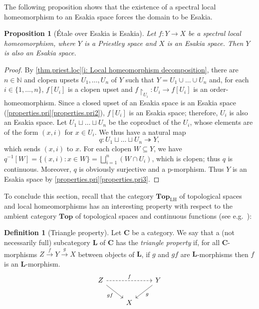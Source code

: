 \documentclass[12pt]{amsart}
\theoremstyle{plain}
\newtheorem{proposition}[theorem]{Proposition}
\theoremstyle{definition}
\newtheorem{definition}[theorem]{Definition}
\newcommand{\cat}[1]{\mathbf{#1}}
\newcommand{\N}{\mathbb{N}}
\newcommand{\Top}{\cat{Top}}
\newcommand{\TopLH}{\Top_{\mathrm{LH}}}
\begin{document}
The following proposition shows that the existence of a spectral local homeomorphism to an Esakia space forces the domain to be Esakia.

\begin{proposition}[\'Etale over Esakia is Esakia]\label{prop: closure of Esakia under spectral}
    Let $f\colon Y\to X$ be a spectral local homeomorphism, where $Y$ is a Priestley space and $X$ is an Esakia space. Then $Y$ is also an Esakia space.
\end{proposition}
\begin{proof}
    By \cref{thm.priest.loc}\eqref{i: Local homeomorphism decomposition}, there are $n \in \N$ and clopen upsets $U_{1},\dots,U_{n}$ of $Y$ such that $Y=U_{1}\cup\dots\cup U_{n}$ and, for each $i \in \{1, \dots, n\}$, $f[U_i]$ is a clopen upset and $f {\restriction}_{U_i} \colon U_i \to f[U_i]$ is an order-homeomorphism.
    Since a closed upset of an Esakia space is an Esakia space (\cref{properties.pri}\eqref{properties.pri2}), $f[U_{i}]$ is an Esakia space; therefore, $U_{i}$ is also an Esakia space. Let $U_{1}\sqcup \dots \sqcup U_{n}$ be the coproduct of the $U_{i}$, whose elements are of the form $(x,i)$ for $x\in U_{i}$. We thus have a natural map
    \begin{equation*}
        q\colon U_{1}\sqcup \dots \sqcup U_{n} \twoheadrightarrow Y,
    \end{equation*}
    which sends $(x,i)$ to $x$. For each clopen $W\subseteq Y$, we have $q^{-1}[W]=\{(x,i) : x\in W\}=\bigsqcup_{i=1}^{n}(W\cap U_{i})$, which is clopen; thus $q$ is continuous. Moreover, $q$ is obviously surjective and a p-morphism. Thus $Y$ is an Esakia space by \cref{properties.pri}\eqref{properties.pri3}.
\end{proof}



To conclude this section, recall that the category $\TopLH$ of topological spaces and local homeomorphisms has an interesting property with respect to the ambient category $\Top$ of topological spaces and continuous functions (see e.g.\ \cite[Lem.~6.4.5]{janelidzeborceaux}):

\begin{definition}[Triangle property]
    Let $\cat{C}$ be a category.
    We say that a (not necessarily full) subcategory $\cat{L}$ of $\cat{C}$ has the \emph{triangle property} if, for all  $\cat{C}$-morphisms $Z \xrightarrow{f} Y \xrightarrow{g} X$ between objects of $\cat{L}$, if $g$ and $g f$ are $\cat{L}$-morphisms then $f$ is an $\cat{L}$-morphism.
    \[
        \begin{tikzcd}
            Z \arrow[rd, "gf"'] \arrow[rr, "f", dashed] &   & Y \arrow[ld, "g"] \\
            & X &                  
        \end{tikzcd}
    \]

\end{definition}
\end{document}

